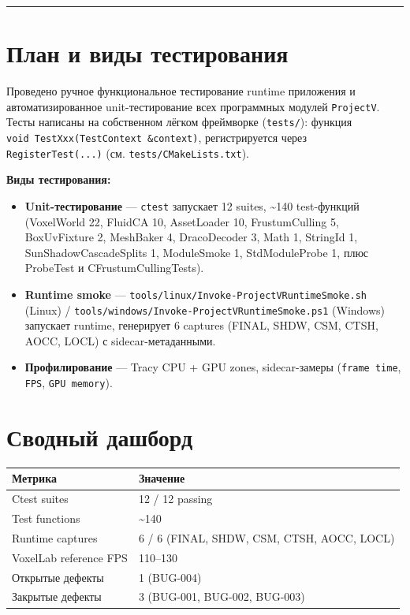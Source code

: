 
\begin{center}\rule{0.5\linewidth}{0.5pt}\end{center}

\section{План и виды тестирования}\label{KT-2.2_Test_Report-ux43fux43bux430ux43d-ux438-ux432ux438ux434ux44b-ux442ux435ux441ux442ux438ux440ux43eux432ux430ux43dux438ux44f}

Проведено ручное функциональное тестирование runtime приложения и автоматизированное unit-тестирование всех программных модулей \texttt{ProjectV}. Тесты написаны на собственном лёгком фреймворке (\texttt{tests/}): функция \texttt{void\ TestXxx(TestContext\ \&context)}, регистрируется через \texttt{RegisterTest(...)} (см. \texttt{tests/CMakeLists.txt}).

\textbf{Виды тестирования:}

\begin{itemize}
\tightlist
\item
  \textbf{Unit-тестирование} --- \texttt{ctest} запускает 12 suites, \textasciitilde140 test-функций (VoxelWorld 22, FluidCA 10, AssetLoader 10, FrustumCulling 5, BoxUvFixture 2, MeshBaker 4, DracoDecoder 3, Math 1, StringId 1, SunShadowCascadeSplits 1, ModuleSmoke 1, StdModuleProbe 1, плюс ProbeTest и CFrustumCullingTests).
\item
  \textbf{Runtime smoke} --- \texttt{tools/linux/Invoke-ProjectVRuntimeSmoke.sh} (Linux) / \texttt{tools/windows/Invoke-ProjectVRuntimeSmoke.ps1} (Windows) запускает runtime, генерирует 6 captures (FINAL, SHDW, CSM, CTSH, AOCC, LOCL) с sidecar-метаданными.
\item
  \textbf{Профилирование} --- Tracy CPU + GPU zones, sidecar-замеры (\texttt{frame\ time}, \texttt{FPS}, \texttt{GPU\ memory}).
\end{itemize}

\section{Сводный дашборд}\label{KT-2.2_Test_Report-ux441ux432ux43eux434ux43dux44bux439-ux434ux430ux448ux431ux43eux440ux434}

\begin{longtable}[]{@{}ll@{}}
\toprule\noalign{}
Метрика & Значение \\
\midrule\noalign{}
\endhead
\bottomrule\noalign{}
\endlastfoot
Ctest suites & 12 / 12 passing \\
Test functions & \textasciitilde140 \\
Runtime captures & 6 / 6 (FINAL, SHDW, CSM, CTSH, AOCC, LOCL) \\
VoxelLab reference FPS & 110--130 \\
Открытые дефекты & 1 (BUG-004) \\
Закрытые дефекты & 3 (BUG-001, BUG-002, BUG-003) \\
\end{longtable}

